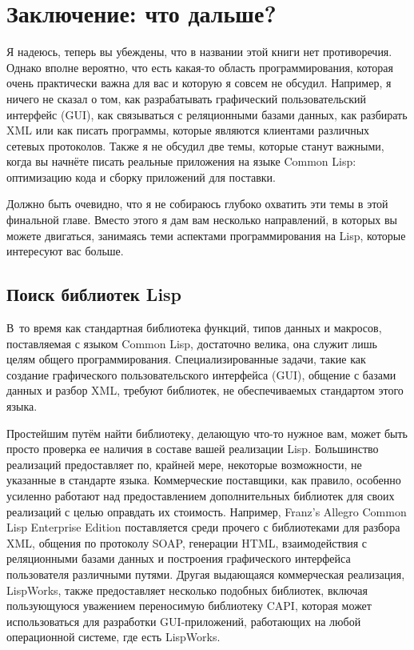 \chapter{Заключение: что дальше?}
\label{ch:32}

\thispagestyle{empty}

Я надеюсь, теперь вы убеждены, что в названии этой книги нет противоречия.  Однако вполне
вероятно, что есть какая-то область программирования, которая очень практически важна для
вас и которую я совсем не обсудил. Например, я ничего не сказал о том, как разрабатывать
графический пользовательский интерфейс (GUI), как связываться с реляционными базами
данных, как разбирать XML или как писать программы, которые являются клиентами различных
сетевых протоколов. Также я не обсудил две темы, которые станут важными, когда вы начнёте
писать реальные приложения на языке Common Lisp: оптимизацию кода и сборку приложений для
поставки.

Должно быть очевидно, что я не собираюсь глубоко охватить эти темы в этой финальной
главе. Вместо этого я дам вам несколько направлений, в которых вы можете двигаться,
занимаясь теми аспектами программирования на Lisp, которые интересуют вас больше.

\section{Поиск библиотек Lisp}

В~то время как стандартная библиотека функций, типов данных и макросов, поставляемая с
языком Common Lisp, достаточно велика, она служит лишь целям общего
программирования. Специализированные задачи, такие как создание графического
пользовательского интерфейса (GUI), общение с базами данных и разбор XML, требуют
библиотек, не обеспечиваемых стандартом этого языка.

Простейшим путём найти библиотеку, делающую что-то нужное вам, может быть просто проверка
ее наличия в составе вашей реализации Lisp. Большинство реализаций предоставляет по,
крайней мере, некоторые возможности, не указанные в стандарте языка. Коммерческие
поставщики, как правило, особенно усиленно работают над предоставлением дополнительных
библиотек для своих реализаций с целью оправдать их стоимость. Например, Franz's Allegro
Common Lisp Enterprise Edition поставляется среди прочего с библиотеками для разбора XML,
общения по протоколу SOAP, генерации HTML, взаимодействия с реляционными базами данных
и построения графического интерфейса пользователя различными путями.  Другая выдающаяся
коммерческая реализация, LispWorks, также предоставляет несколько подобных библиотек,
включая пользующуюся уважением переносимую библиотеку CAPI, которая может использоваться
для разработки GUI-приложений, работающих на любой операционной системе, где есть
LispWorks.

